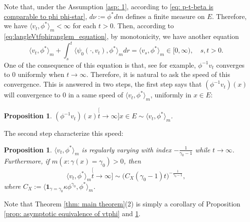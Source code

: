 \documentclass[12pt, a4paper]{amsart}
\newtheorem{prop}[thm]{Proposition}
\theoremstyle{definition}
\numberwithin{equation}{section}
\begin{document}
	Note that, under the Assumption \ref{asp: 1}, according to \eqref{eq: p-t-beta is comparable to phi phi-star}, $d\nu:= \phi^* dm$ defines a finite measure on $E$.
	Therefore, we have $\langle v_t, \phi^*\rangle_m < \infty$ for each $t>0$.
	Then, according to \eqref{eq:langleVtfphiranglem_equation}, by monotonicity, we have another equation
\[ \label{eq: equation of <vt,phi>}
	 \langle v_t,\phi^*\rangle_m + \int_s^t \langle \psi_0(\cdot ,v_t) , \phi^*\rangle_m dr 
	= \langle v_s,\phi^*\rangle_m
	\in [0,\infty),
	\quad s, t > 0.
\]
	One of the consequence of this equation is that, see \cite[Lemma 5.1]{RenSongSun2017Spine} for example, $\phi^{-1}v_t$ converges to $0$ uniformly when $t\to\infty$.
	Therefore, it is natural to ask the speed of this convergence. 
	This is answered in two steps, the first step says that $(\phi^{-1}v_t)(x)$ will convergence to $0$ in a same speed of $\langle v_t,\phi^*\rangle_m $, uniformly in $x\in E$:

\begin{prop}
\label{prop: convergence in a same speed}
	$(\phi^{-1}v_t)(x) \stackrel[t\to\infty]{x\in E}{\sim} \langle v_t,\phi^*\rangle_m$. 
\end{prop}
\label{prop: asymptotic equivalence of vtphi}
	The second step characterize this speed:
\begin{prop}
\label{prop: regularly varying of vt-phi-star}
	$\langle v_t,\phi^*\rangle_m $ is regularly varying with index $-\frac{1}{\gamma_0-1}$ while $t\to \infty$. 
	Furthermore, if $m(x: \gamma (x)= \gamma_0)>0$, then 
\[
	\langle v_t,\phi^*\rangle_m
	\stackrel[t\to \infty]{}{\sim} \big(C_X(\gamma_0-1) t \big)^{-\frac{1}{\gamma_0 - 1}},
\]
	where $C_X:= \langle \mathbf 1_{\gamma= \gamma_0} \kappa \phi^{\gamma_0}, \phi^* \rangle_m $.
\end{prop}

	Note that Theorem \ref{thm: main theorem}(2) is simply a corollary of Proposition \ref{prop: asymptotic equivalence of vtphi} and \ref{prop: regularly varying of vt-phi-star}.  
\end{document}
